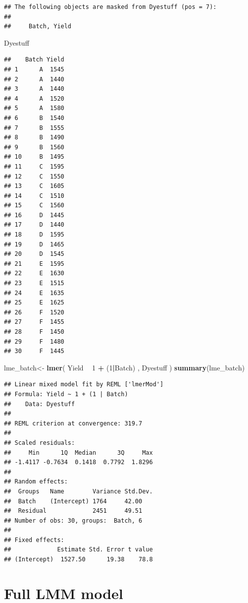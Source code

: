 \documentclass[]{book}
\newenvironment{Shaded}{\begin{snugshade}}{\end{snugshade}}
\newcommand{\KeywordTok}[1]{\textcolor[rgb]{0.13,0.29,0.53}{\textbf{#1}}}
\newcommand{\DecValTok}[1]{\textcolor[rgb]{0.00,0.00,0.81}{#1}}
\newcommand{\StringTok}[1]{\textcolor[rgb]{0.31,0.60,0.02}{#1}}
\newcommand{\OperatorTok}[1]{\textcolor[rgb]{0.81,0.36,0.00}{\textbf{#1}}}
\newcommand{\NormalTok}[1]{#1}
\begin{document}
\begin{verbatim}
## The following objects are masked from Dyestuff (pos = 7):
## 
##     Batch, Yield
\end{verbatim}

\begin{Shaded}
\begin{Highlighting}[]
\NormalTok{Dyestuff}
\end{Highlighting}
\end{Shaded}

\begin{verbatim}
##    Batch Yield
## 1      A  1545
## 2      A  1440
## 3      A  1440
## 4      A  1520
## 5      A  1580
## 6      B  1540
## 7      B  1555
## 8      B  1490
## 9      B  1560
## 10     B  1495
## 11     C  1595
## 12     C  1550
## 13     C  1605
## 14     C  1510
## 15     C  1560
## 16     D  1445
## 17     D  1440
## 18     D  1595
## 19     D  1465
## 20     D  1545
## 21     E  1595
## 22     E  1630
## 23     E  1515
## 24     E  1635
## 25     E  1625
## 26     F  1520
## 27     F  1455
## 28     F  1450
## 29     F  1480
## 30     F  1445
\end{verbatim}

\begin{Shaded}
\begin{Highlighting}[]
\NormalTok{lme_batch<-}\StringTok{ }\KeywordTok{lmer}\NormalTok{( Yield }\OperatorTok{~}\StringTok{ }\DecValTok{1} \OperatorTok{+}\StringTok{ }\NormalTok{(}\DecValTok{1}\OperatorTok{|}\NormalTok{Batch)  , Dyestuff )}
\KeywordTok{summary}\NormalTok{(lme_batch)}
\end{Highlighting}
\end{Shaded}

\begin{verbatim}
## Linear mixed model fit by REML ['lmerMod']
## Formula: Yield ~ 1 + (1 | Batch)
##    Data: Dyestuff
## 
## REML criterion at convergence: 319.7
## 
## Scaled residuals: 
##     Min      1Q  Median      3Q     Max 
## -1.4117 -0.7634  0.1418  0.7792  1.8296 
## 
## Random effects:
##  Groups   Name        Variance Std.Dev.
##  Batch    (Intercept) 1764     42.00   
##  Residual             2451     49.51   
## Number of obs: 30, groups:  Batch, 6
## 
## Fixed effects:
##             Estimate Std. Error t value
## (Intercept)  1527.50      19.38    78.8
\end{verbatim}

\section{Full LMM model}\label{full-lmm-model}
\end{document}
